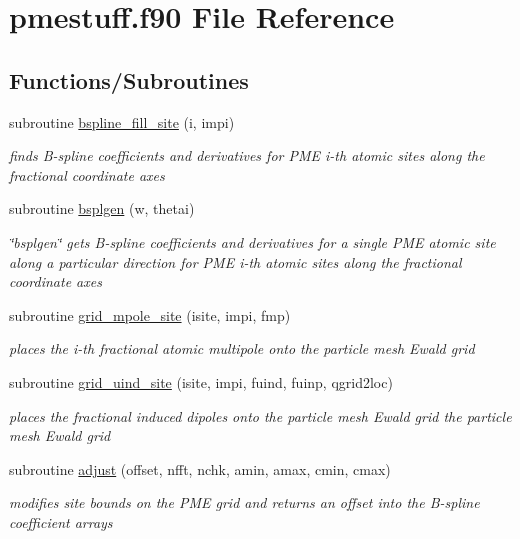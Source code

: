 \hypertarget{pmestuff_8f90}{\section{pmestuff.\-f90 File Reference}
\label{pmestuff_8f90}
}
\subsection*{Functions/\-Subroutines}
\begin{DoxyCompactItemize}
\item 
subroutine \hyperlink{pmestuff_8f90_a2c281b5e322fe3f6933feeb58f5d133e}{bspline\-\_\-fill\-\_\-site} (i, impi)
\begin{DoxyCompactList}\small\item\em finds B-\/spline coefficients and derivatives for P\-M\-E i-\/th atomic sites along the fractional coordinate axes \end{DoxyCompactList}\item 
subroutine \hyperlink{pmestuff_8f90_ab60c473185b72a82ef174c5fcdf24cc7}{bsplgen} (w, thetai)
\begin{DoxyCompactList}\small\item\em \char`\"{}bsplgen\char`\"{} gets B-\/spline coefficients and derivatives for a single P\-M\-E atomic site along a particular direction for P\-M\-E i-\/th atomic sites along the fractional coordinate axes \end{DoxyCompactList}\item 
subroutine \hyperlink{pmestuff_8f90_a4495f1975376db6546014d7ab27b9d62}{grid\-\_\-mpole\-\_\-site} (isite, impi, fmp)
\begin{DoxyCompactList}\small\item\em places the i-\/th fractional atomic multipole onto the particle mesh Ewald grid \end{DoxyCompactList}\item 
subroutine \hyperlink{pmestuff_8f90_a926f0702082531ece71364b60a89cc8e}{grid\-\_\-uind\-\_\-site} (isite, impi, fuind, fuinp, qgrid2loc)
\begin{DoxyCompactList}\small\item\em places the fractional induced dipoles onto the particle mesh Ewald grid the particle mesh Ewald grid \end{DoxyCompactList}\item 
subroutine \hyperlink{pmestuff_8f90_ac4aafef365cd8b32ba802ba270739607}{adjust} (offset, nfft, nchk, amin, amax, cmin, cmax)
\begin{DoxyCompactList}\small\item\em modifies site bounds on the P\-M\-E grid and returns an offset into the B-\/spline coefficient arrays \end{DoxyCompactList}\item 

\end{DoxyCompactItemize}
